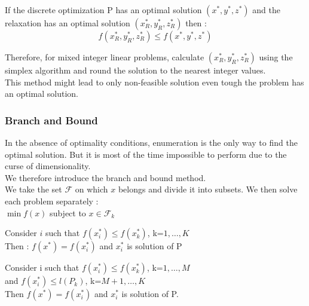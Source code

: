\documentclass[../main.tex]{subfiles}
\begin{document}
If the discrete optimization P has an optimal solution $(x^*, y^*, z^*)$ and the relaxation has an optimal solution $(x_R^*, y_R^*, z_R^*)$ then : \begin{equation}
    f(x_R^*, y_R^*, z_R^*) \leq f(x^*, y^*, z^*)
\end{equation}

Therefore, for mixed integer linear problems, calculate $(x^*_R, y^*_R, z^*_R)$ using the simplex algorithm and round the solution to the nearest integer values.\\
\warning This method might lead to only non-feasible solution even tough the problem has an optimal solution.\\

\subsubsection{Branch and Bound}
In the absence of optimality conditions, enumeration is the only way to find the optimal solution. But it is most of the time impossible to perform due to the curse of dimensionality.\\
We therefore introduce the branch and bound method.\\

We take the set $\mathcal{F}$ on which $x$ belongs and divide it into subsets. We then solve each problem separately : \\
$\min f(x)$ subject to $x\in \mathcal{F}_k$\\

\begin{theoremen}
    Consider $i$ such that $f(x_i^*)\leq f(x_k^*)$, k=$1,\dots, K$\\
    Then : $f(x^*) = f(x_i^*)$ and $x_i^*$ is solution of P\\
\end{theoremen}

\begin{theoremen}
    Consider i such that $f(x_i^*)\leq f(x_k^*)$, k=$1,\dots, M$\\
    and $f(x_i^*) \leq l(P_k)$, k=$M+1, \dots, K$\\
    Then $f(x^*) = f(x_i^*)$ and $x_i^*$ is solution of P.\\
\end{theoremen}
\end{document}
